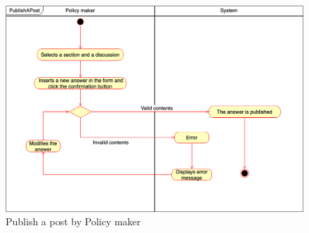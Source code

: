     \begin{figure}[h!]
        \centering
        \includegraphics[scale=0.35]{images/use_cases_diagram/policymaker_publish_post.png}
        \caption{Publish a post by Policy maker}
        \label{fig:policymaker_publish_post}
    \end{figure}
\FloatBarrier

\newpage

